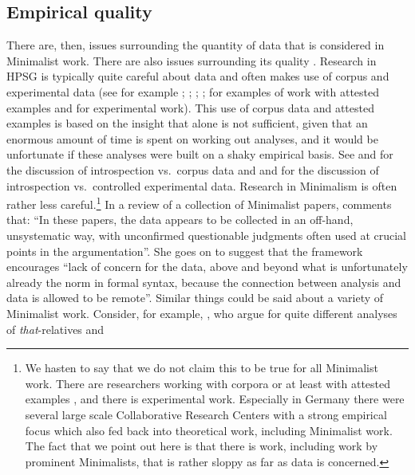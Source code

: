 \documentclass[output=paper,biblatex,babelshorthands,newtxmath,draftmode,colorlinks,citecolor=brown]{langscibook}
\begin{document}
\subsection{Empirical quality}
\label{sec-empirical-quality}

\largerpage
There are, then, issues surrounding the quantity of data that is considered in Minimalist work. There are
also issues surrounding its quality \citep{Schuetze2016a}. Research in HPSG is typically quite careful about data and often
makes use of corpus and experimental data (see for example
\citealt*{AA2017a-u,Mueller99a,Mueller2002b,BC2010a,MBC2012a,Chaves2013a-u,Miller2013a}; \citealt[Chapter~7]{VanEynde2015a-u};
\citealt{ACS2016a-u}; \citealt{SAHM2019a-u}; \citealt{Winckel2020a}
for examples of work with attested examples and for experimental work).
This use of corpus data and attested examples is based on the insight that  alone is not sufficient, given that an
enormous amount of time is spent on working out analyses, and it would be unfortunate if these analyses
were built on a shaky empirical basis. See  and  for the
discussion of introspection vs.\ corpus data and  and  for the discussion of introspection
vs.\ controlled experimental data.
Research in Minimalism is often rather less
careful.\footnote{
 We hasten to say that we do not claim this to be true for all Minimalist work. There are
 researchers working with corpora or at least with attested examples \citep{Wurmbrand2003a}, and
 there is experimental work. Especially in Germany there were several large scale Collaborative
 Research Centers with a strong empirical focus which also fed back into theoretical work, including
 Minimalist work. The fact that we point out here is that there is work, including work
 by prominent Minimalists, that is rather sloppy as far as data is concerned.%
} In a review of a collection of Minimalist papers, \citet[]{Bender2002b-u} comments that: ``In
these papers, the data appears to be collected in an off-hand, unsystematic way, with unconfirmed
questionable judgments often used at crucial points in the argumentation''. She goes on to suggest
that the framework encourages ``lack of concern for the data, above and beyond what is unfortunately
already the norm in formal syntax, because the connection between analysis and data is allowed to be
remote''. Similar things could be said about a variety of Minimalist work. Consider, for example,
\citet{AL2003a-u}, who argue for quite different analyses of \emph{that}-relatives and
\end{document}
